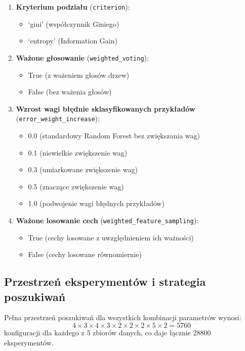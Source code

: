 \documentclass[12pt,a4paper]{article}
\begin{document}
\begin{enumerate}
    \item \textbf{Kryterium podziału} (\texttt{criterion}):
    \begin{itemize}
        \item `gini' (współczynnik Giniego)
        \item `entropy' (Information Gain)
    \end{itemize}

    \item \textbf{Ważone głosowanie} (\texttt{weighted\_voting}):
    \begin{itemize}
        \item True (z ważeniem głosów drzew)
        \item False (bez ważenia głosów)
    \end{itemize}

    \item \textbf{Wzrost wagi błędnie sklasyfikowanych przykładów} (\texttt{error\_weight\_increase}):
    \begin{itemize}
        \item 0.0 (standardowy Random Forest bez zwiększania wag)
        \item 0.1 (niewielkie zwiększenie wag)
        \item 0.3 (umiarkowane zwiększenie wag)
        \item 0.5 (znaczące zwiększenie wag)
        \item 1.0 (podwojenie wagi błędnych przykładów)
    \end{itemize}

    \item \textbf{Ważone losowanie cech} (\texttt{weighted\_feature\_sampling}):
    \begin{itemize}
        \item True (cechy losowane z uwzględnieniem ich ważności)
        \item False (cechy losowane równomiernie)
    \end{itemize}
\end{enumerate}

\subsection{Przestrzeń eksperymentów i strategia poszukiwań}
\begin{sloppypar}
Pełna przestrzeń poszukiwań dla wszystkich kombinacji parametrów wynosi:
\begin{equation}
4 \times 3 \times 4 \times 3 \times 2 \times 2 \times 2 \times 5 \times 2 = 5760
\end{equation}
konfiguracji dla każdego z 5 zbiorów danych, co daje łącznie 28800 eksperymentów.
\end{sloppypar}
\end{document}
